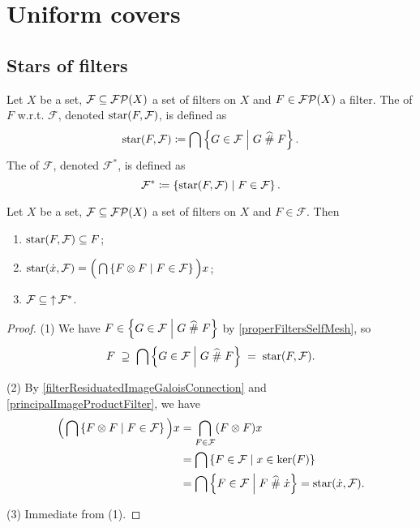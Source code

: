 \section{Uniform covers}
\subsection{Stars of filters}
\begin{definition}
Let $X$ be a set, $\mathcal{F} \subseteq \operatorname{\mathcal{FP}}(X)$ a set of filters on $X$ and $F\in\operatorname{\mathcal{FP}}(X)$ a filter. The  of $F$ w.r.t. $\mathcal{F}$, denoted $\operatorname{star}(F,\mathcal{F})$, is defined as
\[ \operatorname{star}(F,\mathcal{F}) \coloneqq \bigcap \left\{ G\in \mathcal{F} \;\middle|\; G \mathrel{\widehat{\#}} F \right\}. \]
The  of $\mathcal{F}$, denoted $\mathcal{F}^*$, is defined as
\[ \mathcal{F}^* \coloneqq \left\{ \operatorname{star}(F,\mathcal{F}) \;\middle|\; F\in \mathcal{F} \right\}. \]
\end{definition}

\begin{lemma} \label{starRefinementLemma}
Let $X$ be a set, $\mathcal{F} \subseteq \operatorname{\mathcal{FP}}(X)$ a set of filters on $X$ and $F\in \mathcal{F}$. Then
\begin{enumerate}
\item $\operatorname{star}(F,\mathcal{F}) \subseteq F$;
\item $\operatorname{star}(\dot{x}, \mathcal{F}) = \Big(\bigcap\left\{ F\otimes F \;\middle|\; F\in\mathcal{F} \right\}\Big)x$;
\item $\mathcal{F} \subseteq \operatorname{\uparrow}\mathcal{F}^*$.
\end{enumerate}
\end{lemma}
\begin{proof}
(1) We have $F\in \left\{ G\in \mathcal{F} \;\middle|\; G \mathrel{\widehat{\#}} F \right\}$ by \ref{properFiltersSelfMesh}, so
\[ F \;\supseteq\; \bigcap \left\{ G\in \mathcal{F} \;\middle|\; G \mathrel{\widehat{\#}} F \right\} \;=\; \operatorname{star}(F,\mathcal{F}). \]

(2) By \ref{filterResiduatedImageGaloisConnection} and \ref{principalImageProductFilter}, we have
\begin{align*}
\Big(\bigcap\left\{ F\otimes F \;\middle|\; F\in\mathcal{F} \right\}\Big)x &= \bigcap_{F\in\mathcal{F}}(F\otimes F)x \\
&= \bigcap \left\{ F\in\mathcal{F} \;\middle|\; x\in\ker(F) \right\} \\
&= \bigcap \left\{ F\in\mathcal{F} \;\middle|\; F\mathrel{\widehat{\#}}\dot{x} \right\} = \operatorname{star}(\dot{x}, \mathcal{F}).
\end{align*}

(3) Immediate from (1).
\end{proof}

